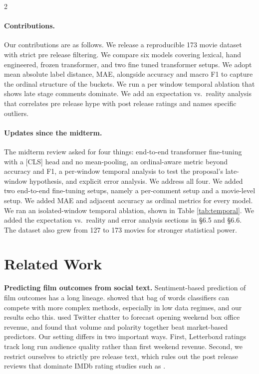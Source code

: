 \documentclass[10pt,letterpaper]{article}
\begin{document}
\begin{multicols}{2}
\paragraph{Contributions.} Our contributions are as follows. We release a reproducible 173 movie dataset with strict pre release filtering. We compare six models covering lexical, hand engineered, frozen transformer, and two fine tuned transformer setups. We adopt mean absolute label distance, MAE, alongside accuracy and macro F1 to capture the ordinal structure of the buckets. We run a per window temporal ablation that shows late stage comments dominate. We add an expectation vs.\ reality analysis that correlates pre release hype with post release ratings and names specific outliers.

\paragraph{Updates since the midterm.} The midterm review asked for four things: end-to-end transformer fine-tuning with a [CLS] head and no mean-pooling, an ordinal-aware metric beyond accuracy and F1, a per-window temporal analysis to test the proposal's late-window hypothesis, and explicit error analysis. We address all four. We added two end-to-end fine-tuning setups, namely a per-comment setup and a movie-level setup. We added MAE and adjacent accuracy as ordinal metrics for every model. We ran an isolated-window temporal ablation, shown in Table \ref{tab:temporal}. We added the expectation vs.\ reality and error analysis sections in §6.5 and §6.6. The dataset also grew from 127 to 173 movies for stronger statistical power.

\vspace{-10pt}

\section{Related Work}
\noindent \textbf{Predicting film outcomes from social text.} Sentiment-based prediction of film outcomes has a long lineage. \cite{pang2002} showed that bag of words classifiers can compete with more complex methods, especially in low data regimes, and our results echo this. \cite{asur2010} used Twitter chatter to forecast opening weekend box office revenue, and found that volume and polarity together beat market-based predictors. Our setting differs in two important ways. First, Letterboxd ratings track long run audience quality rather than first weekend revenue. Second, we restrict ourselves to strictly pre release text, which rules out the post release reviews that dominate IMDb rating studies such as \cite{maas2011}.


\end{multicols}
\end{document}
